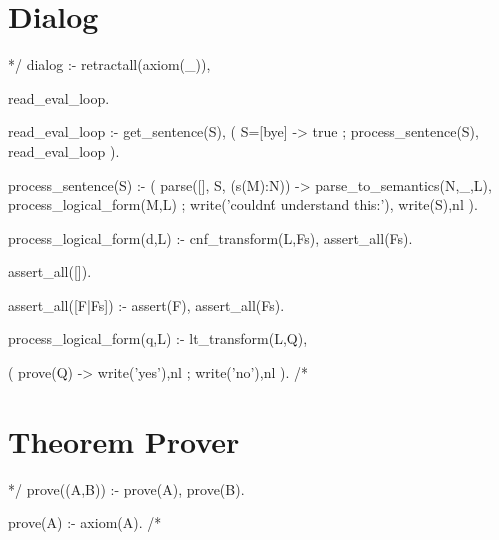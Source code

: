 \documentclass{book}[9pt]
\newenvironment{code}%
{\small \verbatim}%
{\endverbatim \large}
\begin{document}
\section{Dialog}

\begin{code}
*/
dialog :-
        retractall(axiom(_)),
        
        read_eval_loop.

read_eval_loop :-
        get_sentence(S),
        ( S=[bye] ->
            true
        ;
            process_sentence(S),
            read_eval_loop
        ).

process_sentence(S) :-
        (  parse([], S, (s(M):N)) ->
            parse_to_semantics(N,_,L),
            process_logical_form(M,L)
        ;
             write('couldn\'t understand this:'),
             write(S),nl
        ).


process_logical_form(d,L) :-
    cnf_transform(L,Fs),
    assert_all(Fs).

assert_all([]).
    
assert_all([F|Fs]) :-
    assert(F),
    assert_all(Fs).

process_logical_form(q,L) :-
    lt_transform(L,Q),
    
    (  prove(Q) ->
        write('yes'),nl
     ; 
        write('no'),nl
    ).
/*
\end{code}

\section{Theorem Prover}

\begin{code}
*/
prove((A,B)) :-
    prove(A),
    prove(B).

prove(A) :- axiom(A).
/*
\end{code}


\backmatter
\end{document}

